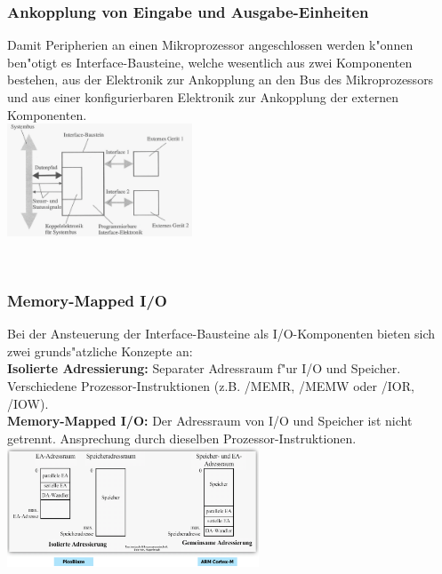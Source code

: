 \begin{minipage}[t]{8cm}
	\subsubsection{Ankopplung von Eingabe und Ausgabe-Einheiten}
	Damit Peripherien an einen Mikroprozessor angeschlossen werden k"onnen ben"otigt es Interface-Bausteine, welche wesentlich aus zwei Komponenten bestehen, aus der Elektronik zur Ankopplung an den Bus des Mikroprozessors und aus einer konfigurierbaren Elektronik zur Ankopplung der externen Komponenten.\\
	\includegraphics[width=5.5cm]{pics/Interface-Komponenten}
\end{minipage}
% 
\begin{minipage}{0.5cm}
	\ \
\end{minipage}
%
\begin{minipage}[t]{10cm}
	\subsubsection{Memory-Mapped I/O}
	Bei der Ansteuerung der Interface-Bausteine als I/O-Komponenten bieten sich zwei grunds"atzliche Konzepte an:\\
	\textbf{Isolierte Adressierung:} Separater Adressraum f"ur I/O und Speicher. Verschiedene Prozessor-Instruktionen (z.B. /MEMR, /MEMW oder /IOR, /IOW).\\
	\textbf{Memory-Mapped I/O:} Der Adressraum von I/O und Speicher ist nicht getrennt. Ansprechung durch dieselben Prozessor-Instruktionen.\\
	\includegraphics[width=7.5cm]{pics/Adressbereich}
\end{minipage}

